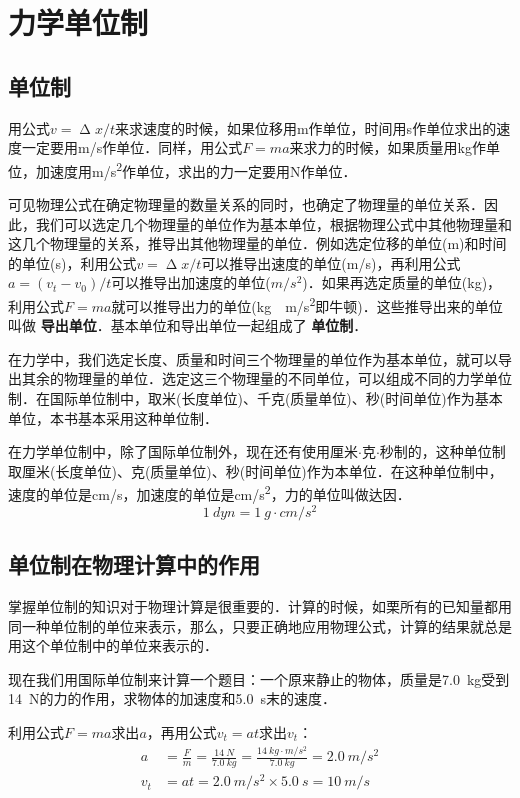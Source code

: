\section{力学单位制}
\subsection{单位制}
用公式$v=\upDelta x/t$来求速度的时候，如果位移用\si{m}作单位，时间用\si{s}作单位求出的速度一定要用\si{m/s}作单位．同样，用公式$F=ma$来求力的时候，如果质量用\si{kg}作单位，加速度用\si{m/s^2}作单位，求出的力一定要用\si{N}作单位．

可见物理公式在确定物理量的数量关系的同时，也确定了物理量的单位关系．因此，我们可以选定几个物理量的单位作为基本单位，根据物理公式中其他物理量和这几个物理量的关系，推导出其他物理量的单位．例如选定位移的单位(\si{m})和时间的单位(\si{s})，利用公式$v=\upDelta x/t$可以推导出速度的单位(\si{m/s})，再利用公式$a=(v_t-v_0)/t$可以推导出加速度的单位($\si{m/s^2}$)．如果再选定质量的单位(\si{kg})，利用公式$F=ma$就可以推导出力的单位(\si{kg \cdot m/s^2}即牛顿)．这些推导出来的单位叫做\textbf{ 导出单位}．基本单位和导出单位一起组成了\textbf{ 单位制}．

在力学中，我们选定长度、质量和时间三个物理量的单位作为基本单位，就可以导出其余的物理量的单位．选定这三个物理量的不同单位，可以组成不同的力学单位制．在国际单位制中，取米(长度单位)、千克(质量单位)、秒(时间单位)作为基本单位，本书基本采用这种单位制．

在力学单位制中，除了国际单位制外，现在还有使用厘米$\cdot$克$\cdot$秒制的，这种单位制取厘米(长度单位)、克(质量单位)、秒(时间单位)作为本单位．在这种单位制中，速度的单位是\si{cm/s}，加速度的单位是\si{cm/s^2}，力的单位叫做达因．
\[\SI{1}{dyn}=\SI{1}{g\cdot cm/s^2}  \]


\subsection{单位制在物理计算中的作用}
掌握单位制的知识对于物理计算是很重要的．计算的时候，如栗所有的已知量都用同一种单位制的单位来表示，那么，只要正确地应用物理公式，计算的结果就总是用这个单位制中的单位来表示的．

现在我们用国际单位制来计算一个题目：一个原来静止的物体，质量是\SI{7.0}{kg}受到\SI{14}{N}的力的作用，求物体的加速度和\SI{5.0}{s}末的速度．

利用公式$F= ma$求出$a$，再用公式$v_t= at$求出$v_t$：
\[\begin{split}
        a   & =\frac{F}{m}=\frac{\SI{14}{N}}{\SI{7.0}{kg}}=\frac{\SI{14}{kg\cdot m/s^2}}{\SI{7.0}{kg}}=\SI{2.0}{m/s^2} \\
        v_t & =at=\SI{2.0}{m/s^2} \times \SI{5.0}{s}=\SI{10}{m/s}
    \end{split} \]

